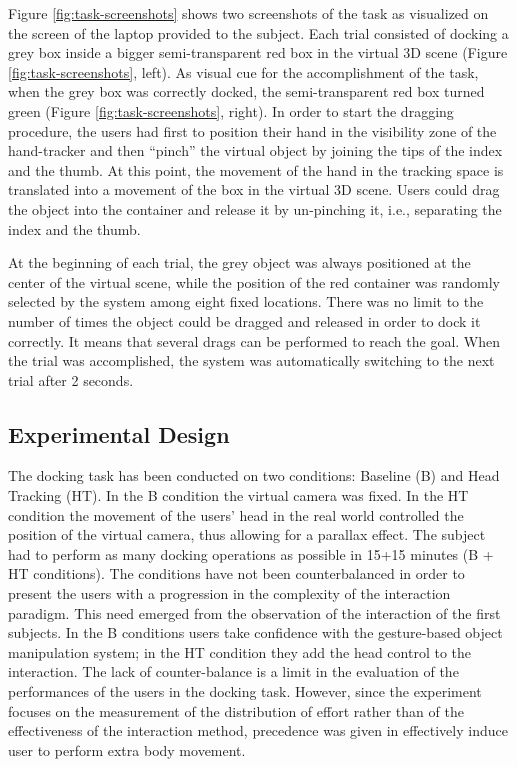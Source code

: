 Figure \ref{fig:task-screenshots} shows two screenshots of the task as visualized on the screen of the laptop provided to the subject. Each trial consisted of docking a grey box inside a bigger semi-transparent red box in the virtual 3D scene (Figure \ref{fig:task-screenshots}, left).
As visual cue for the accomplishment of the task, when the grey box was correctly docked, the semi-transparent red box turned green (Figure \ref{fig:task-screenshots}, right).
In order to start the dragging procedure, the users had first to position their hand in the visibility zone of the hand-tracker and then ``pinch'' the virtual object by joining the tips of the index and the thumb. At this point, the movement of the hand in the tracking space is translated into a movement of the box in the virtual 3D scene. Users could drag the object into the container and release it by un-pinching it, i.e., separating the index and the thumb.

At the beginning of each trial, the grey object was always positioned at the center of the virtual scene, while the position of the red container was randomly selected by the system among eight fixed locations.
There was no limit to the number of times the object could be dragged and released in order to dock it correctly. It means that several drags can be performed to reach the goal.
When the trial was accomplished, the system was automatically switching to the next trial after 2 seconds.

\subsection{Experimental Design}

The docking task has been conducted on two conditions: Baseline (B) and Head Tracking (HT). In the B condition the virtual camera was fixed. In the HT condition the movement of the users' head in the real world controlled the position of the virtual camera, thus allowing for a parallax effect.
The subject had to perform as many docking operations as possible in 15+15 minutes (B + HT conditions). 
The conditions have not been counterbalanced in order to present the users with a progression in the complexity of the interaction paradigm. This need emerged from the observation of the interaction of the first subjects. In the B conditions users take confidence with the gesture-based object manipulation system; in the HT condition they add the head control to the interaction.
The lack of counter-balance is a limit in the evaluation of the performances of the users in the docking task. However, since the experiment focuses on the measurement of the distribution of effort rather than of the effectiveness of the interaction method, precedence was given in effectively induce user to perform extra body movement.


